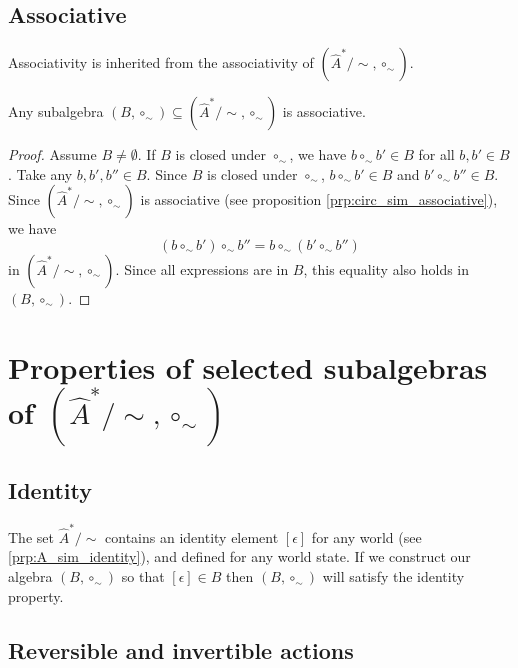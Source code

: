 \subsection{Associative}
Associativity is inherited from the associativity of $(\hat{A}^{*}/\sim, \circ_{\sim})$.
\begin{proposition}\label{prp:any_subalgebra_associative}
    Any subalgebra $(B, \circ_{\sim}) \subseteq (\hat{A}^{*}/\sim, \circ_{\sim})$ is associative.
\end{proposition}
\begin{proof}
    Assume $B \neq \emptyset$.
    If $B$ is closed under $\circ_{\sim}$, we have $b \circ_{\sim} b' \in B$ for all $b,b' \in B$.
    Take any $b, b', b'' \in B$.
    Since $B$ is closed under $\circ_{\sim}$, $b \circ_{\sim} b' \in B$ and $b' \circ_{\sim} b'' \in B$.
    Since $(\hat{A}^{*}/\sim, \circ_{\sim})$ is associative (see proposition \ref{prp:circ_sim_associative}), we have
    \begin{equation}
        (b \circ_{\sim} b') \circ_{\sim} b'' = b \circ_{\sim} (b' \circ_{\sim} b'')
    \end{equation}
    in $(\hat{A}^{*}/\sim, \circ_{\sim})$.
    Since all expressions are in $B$, this equality also holds in $(B, \circ_{\sim})$.
\end{proof}

\section{
Properties of selected subalgebras \texorpdfstring{of $(\hat{A}^{*}/\sim, \circ_{\sim})$}{}
}

\subsection{Identity}
The set $\hat{A}^{*}/\sim$ contains an identity element $[\epsilon]$ for any world (see \cref{prp:A_sim_identity}), and defined for any world state.
If we construct our algebra $(B, \circ_{\sim})$ so that $[\epsilon] \in B$ then $(B, \circ_{\sim})$ will satisfy the identity property.


\subsection{Reversible and invertible actions}
